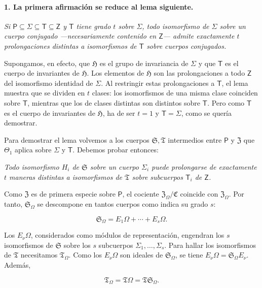 \paragraph{1. La primera afirmación se reduce al lema siguiente.}

\emph{Si $\mathsf P\subseteq\Sigma\subseteq\mathsf T\subseteq\mathsf Z$ y $\mathsf T$ tiene grado $t$ sobre $\Sigma$, todo isomorfismo de $\Sigma$ sobre un cuerpo conjugado ---necesariamente contenido en $\mathsf Z$--- admite exactamente $t$ prolongaciones distintas a isomorfismos de $\mathsf T$ sobre cuerpos conjugados.}

Supongamos, en efecto, que $\mathfrak H$ es el grupo de invariancia de $\Sigma$ y que $\mathsf T$ es el cuerpo de invariantes de $\mathfrak H$. Los elementos de $\mathfrak H$ son las prolongaciones a todo $\mathsf Z$ del isomorfismo identidad de $\Sigma$. Al restringir estas prolongaciones a $\mathsf T$, el lema muestra que se dividen en $t$ clases: los isomorfismos de una misma clase coinciden sobre $\mathsf T$, mientras que los de clases distintas son distintos sobre $\mathsf T$. Pero como $\mathsf T$ es el cuerpo de invariantes de $\mathfrak H$, ha de ser $t=1$ y $\mathsf T=\Sigma$, como se quería demostrar.

Para demostrar el lema volvemos a los cuerpos $\mathfrak S,\mathfrak T$ intermedios entre $\mathsf P$ y $\mathfrak Z$ que $\Theta_1$ aplica sobre $\Sigma$ y $\mathsf T$. Debemos probar entonces:

\emph{Todo isomorfismo $H_i$ de $\mathfrak S$ sobre un cuerpo $\Sigma_i$ puede prolongarse de exactamente $t$ maneras distintas a isomorfismos de $\mathfrak T$ sobre subcuerpos $\mathsf T_i$ de $\mathsf Z$.}

Como $\mathfrak Z$ es de primera especie sobre $\mathsf P$, el cociente $\mathfrak Z_\Omega/\mathfrak C$ coincide con $\mathfrak Z_\Omega$. Por tanto, $\mathfrak S_\Omega$ se descompone en tantos cuerpos como indica su grado $s$:

\[
\mathfrak S_\Omega=E_1\Omega+\cdots+E_s\Omega.
\]

Los $E_\nu\Omega$, considerados como módulos de representación, engendran los $s$ isomorfismos de $\mathfrak S$ sobre los $s$ subcuerpos $\Sigma_1,\ldots,\Sigma_s$. Para hallar los isomorfismos de $\mathfrak T$ necesitamos $\mathfrak T_\Omega$. Como los $E_\nu\Omega$ son ideales de $\mathfrak S_\Omega$, se tiene $E_\nu\Omega=\mathfrak S_\Omega E_\nu$. Además,

\[
\mathfrak T_\Omega=\mathfrak T\Omega=\mathfrak T\mathfrak S_\Omega.
\]

